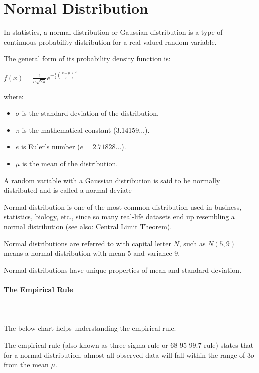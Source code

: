 \documentclass{article}
\begin{document}
\clearpage

\section{Normal Distribution}
In statistics, a normal distribution or Gaussian distribution is a type of continuous probability distribution for a real-valued random variable. 

The general form of its probability density function is:

$\displaystyle f(x)={\frac {1}{\sigma {\sqrt {2\pi }}}}e^{-{\frac {1}{2}}\left({\frac {x-\mu }{\sigma }}\right)^{2}}$

where:
\begin{itemize}
    \item $\sigma$ is the standard deviation of the distribution.
    \item $\pi$ is the mathematical constant (3.14159...).
    \item $e$ is Euler's number ($ e=2.71828\ldots$).
    \item $\mu$ is the mean of the distribution.
\end{itemize}

A random variable with a Gaussian distribution is said to be normally distributed and is called a normal deviate

Normal distribution is one of the most common distribution used in business, statistics, biology, etc., since so many real-life datasets end up resembling a normal distribution (see also: Central Limit Theorem).

Normal distributions are referred to with capital letter $N$, such as $N(5,9)$ means a normal distribution with mean 5 and variance 9.

Normal distributions have unique properties of mean and standard deviation.

\paragraph{The Empirical Rule}\mbox{} \\
\mbox{} \\

The below chart helps understanding the empirical rule.

The empirical rule (also known as three-sigma rule or 68-95-99.7 rule) states that for a normal distribution, almost all observed data will fall within the range of $3 \sigma $ from the mean $ \mu $. 
\end{document}
